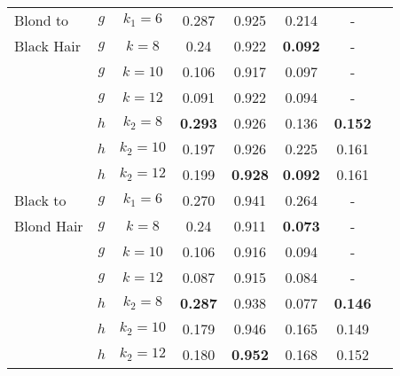 \documentclass{article} %
\begin{document}
\begin{table}[t]
\begin{tabular}{lccccccc}
\midrule
Blond to  & $g$ & $k_1=6$ & 0.287      & 0.925      &     0.214        &          -        \\
Black Hair                    & $g$& $k=8$  &  0.24	& 0.922                     &          \bf{0.092}   &         -         \\
                    & $g$& $k=10$ &     0.106&	0.917             &        0.097     &         -         \\
                    & $g$& $k=12$ &     0.091 &	0.922           &       0.094      &        -          \\
                    & $h$& $k_2=8$  & \bf{0.293}      & 0.926      &    0.136        &   \bf{0.152}              \\
                    & $h$& $k_2=10$& 0.197      & 0.926      &    0.225         &    0.161              \\
                    & $h$& $k_2=12$ & 0.199      & \bf{0.928}      &     \bf{0.092}        &    0.161              \\
\midrule
Black to &  $g$ & $k_1=6$  & 0.270       & 0.941      &     0.264        &          -        \\
Blond Hair    & $g$& $k=8$ &      0.24	 & 0.911            &    \bf{0.073}         &       -           \\
                    & $g$& $k=10$  &    0.106 &	0.916            &    0.094         &       -           \\
                    & $g$& $k=12$ &     0.087	 & 0.915            &   0.084          &       -           \\
                    & $h$& $k_2=8$ & \bf{0.287}      & 0.938      &    0.077         &     \bf{0.146}             \\
                    &  $h$& $k_2=10$ & 0.179      & 0.946      &   0.165          &     0.149             \\
                    & $h$& $k_2=12$ & 0.180       & \bf{0.952}      &    0.168         &    0.152       \\



\end{tabular}
\end{table}
\end{document}

